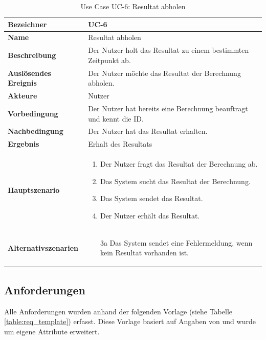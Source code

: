 \begin{table}[ht]
\centering
  \begin{tabular}{ l | p{10cm} }
	\hline
	\rowcolor{gray}
	\textbf{Bezeichner}	&	\textbf{UC-6}\\ \hline
	\textbf{Name}			&	Resultat abholen\\ \hline
	\textbf{Beschreibung}	&	Der Nutzer holt das Resultat zu einem bestimmten Zeitpunkt ab.\\ \hline
	\textbf{Auslösendes Ereignis}&	Der Nutzer möchte das Resultat der Berechnung abholen.\\ \hline
	\textbf{Akteure}		&	Nutzer\\ \hline
	\textbf{Vorbedingung}	&	Der Nutzer hat bereits eine Berechnung beauftragt und kennt die ID.\\ \hline
	\textbf{Nachbedingung}	&	Der Nutzer hat das Resultat erhalten.\\ \hline
	\textbf{Ergebnis}		&	Erhalt des Resultats\\ \hline
	\textbf{Hauptszenario}	&	\begin{enumerate}
					\item Der Nutzer fragt das Resultat der Berechnung ab.
					\item Das System sucht das Resultat der Berechnung.
					\item Das System sendet das Resultat.
					\item Der Nutzer erhält das Resultat.
					\end{enumerate}
					\\ \hline
	\textbf{Alternativszenarien}	&	\begin{enumerate}
					\item[3a] Das System sendet eine Fehlermeldung, wenn kein Resultat vorhanden ist.
					\end{enumerate}
					\\ \hline
  \end{tabular}
   \caption{Use Case UC-6: Resultat abholen}\label{table:use_case_6}
\end{table}

\newpage
\FloatBarrier
\subsection{Anforderungen}\label{anforderungen}
Alle Anforderungen wurden anhand der folgenden Vorlage (siehe Tabelle \ref{table:req_template}) erfasst. Diese Vorlage basiert auf Angaben von \cite{req_eng_book} und wurde um 
eigene Attribute erweitert.

